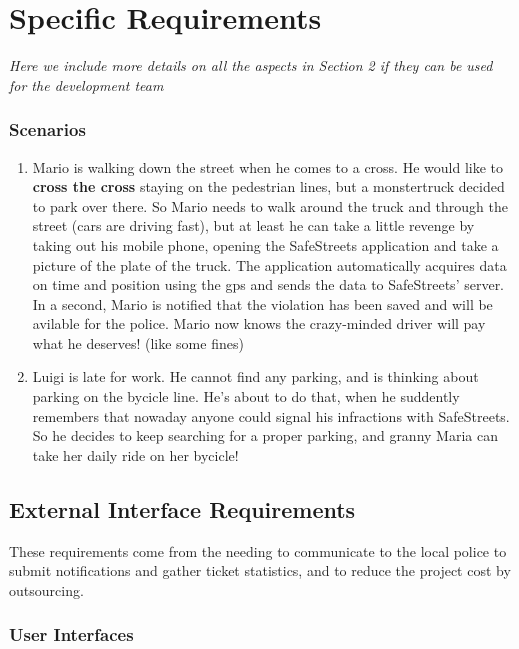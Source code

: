 \documentclass{article}
\newcommand{\enum}[1]{\texttt{#1.\arabic*}}
\begin{document}
\newpage
\section{Specific Requirements} \textit{Here we include more details on all the aspects in Section 2 if they can be used for the development team}

		\subsubsection{Scenarios}
		
			\begin{enumerate}[label=\enum{S}]
				\item \label{S_The man, the street and the monstertruck}
				Mario is walking down the street when he comes to a cross. He would like to \textbf{cross the cross} staying on the pedestrian lines, but a monstertruck decided to park over there. So Mario needs to walk around the truck and through the street (cars are driving fast), but at least he can take a little revenge by taking out his mobile phone, opening the SafeStreets application and take a picture of the plate of the truck. The application automatically acquires data on time and position using the gps and sends the data to SafeStreets' server. In a second, Mario is notified that the violation has been saved and will be avilable for the police.
Mario now knows the crazy-minded driver will pay what he deserves! (like some fines)
				\item \label{S_Prevent is better than healing}Luigi is late for work. He cannot find any parking, and is thinking about parking on the bycicle line. He's about to do that, when he suddently remembers that nowaday anyone could signal his infractions with SafeStreets. So he decides to keep searching for a proper parking, and granny Maria can take her daily ride on her bycicle!
			\end{enumerate}

\newpage
	\subsection{External Interface Requirements}
		These requirements come from the needing to communicate to the local police to submit notifications and gather ticket statistics, and to reduce the project cost by outsourcing.
		
		\subsubsection{User Interfaces}
		
\end{document}
